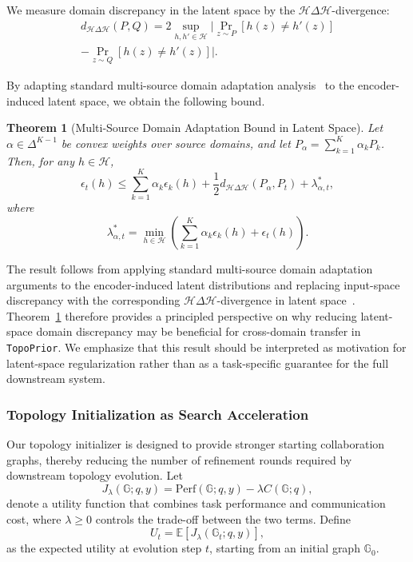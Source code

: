 \documentclass[lettersize,journal]{IEEEtran}
\theoremstyle{plain}
\newtheorem{theorem}{Theorem}
\begin{document}
We measure domain discrepancy in the latent space by the $\mathcal{H}\Delta\mathcal{H}$-divergence:
\begin{multline}
d_{\mathcal{H}\Delta\mathcal{H}}(P,Q)
=
2\sup_{h,h'\in\mathcal{H}}
\big|\Pr_{z\sim P}[h(z)\neq h'(z)] \\
-\Pr_{z\sim Q}[h(z)\neq h'(z)]\big|.
\end{multline}

By adapting standard multi-source domain adaptation analysis~\cite{DBLP:conf/icml/0002CZG19,DBLP:conf/uai/SiciliaAAH22} to the encoder-induced latent space, we obtain the following bound.

\begin{theorem}[Multi-Source Domain Adaptation Bound in Latent Space]
\label{thm:multi_domain}
Let $\alpha\in\Delta^{K-1}$ be convex weights over source domains, and let $P_\alpha=\sum_{k=1}^{K}\alpha_k P_k$. Then, for any $h\in\mathcal{H}$,
\begin{equation}
\epsilon_t(h)
\leq
\sum_{k=1}^{K}\alpha_k\epsilon_k(h)
+
\frac{1}{2}d_{\mathcal{H}\Delta\mathcal{H}}(P_\alpha,P_t)
+
\lambda^*_{\alpha,t},
\end{equation}
where
\begin{equation}
\lambda^*_{\alpha,t}
=
\min_{h\in\mathcal{H}}
\left(
\sum_{k=1}^{K}\alpha_k\epsilon_k(h)+\epsilon_t(h)
\right).
\end{equation}
\end{theorem}

The result follows from applying standard multi-source domain adaptation arguments to the encoder-induced latent distributions and replacing input-space discrepancy with the corresponding $\mathcal{H}\Delta\mathcal{H}$-divergence in latent space~\cite{DBLP:conf/icml/0002CZG19,DBLP:conf/uai/SiciliaAAH22}. Theorem~\ref{thm:multi_domain} therefore provides a principled perspective on why reducing latent-space domain discrepancy may be beneficial for cross-domain transfer in \texttt{TopoPrior}. We emphasize that this result should be interpreted as motivation for latent-space regularization rather than as a task-specific guarantee for the full downstream system.

\subsubsection{Topology Initialization as Search Acceleration}
\label{subsec:acceleration}
Our topology initializer is designed to provide stronger starting collaboration graphs, thereby reducing the number of refinement rounds required by downstream topology evolution. Let
\begin{equation}
J_\lambda(\mathbb{G};q,y)=\mathrm{Perf}(\mathbb{G};q,y)-\lambda C(\mathbb{G};q),
\end{equation}
denote a utility function that combines task performance and communication cost, where $\lambda\geq 0$ controls the trade-off between the two terms. Define
\begin{equation}
U_t=\mathbb{E}[J_\lambda(\mathbb{G}_t;q,y)],
\end{equation}
as the expected utility at evolution step $t$, starting from an initial graph $\mathbb{G}_0$.
\end{document}
